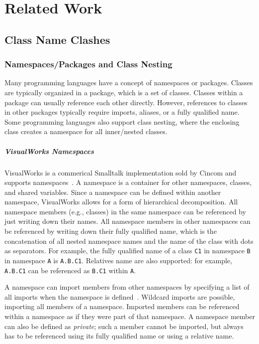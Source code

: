 \chapter{Related Work}
\label{sec:related}

\section{Class Name Clashes}

\subsection{Namespaces/Packages and Class Nesting}
Many programming languages have a concept of namespaces or packages. Classes are typically organized in a package, which is a set of classes. Classes within a package can usually reference each other directly. However, references to classes in other packages typically require imports, aliases, or a fully qualified name. Some programming languages also support class nesting, where the enclosing class creates a namespace for all inner/nested classes.

\paragraph{VisualWorks Namespaces}
VisualWorks is a commerical Smalltalk implementation sold by Cincom and supports namespaces~\cite{brauer2015programming}. A namespace is a container for other namespaces, classes, and shared variables. Since a namespace can be defined within another namespace, VisualWorks allows for a form of hierarchical decomposition. All namespace members (e.g., classes) in the same namespace can be referenced by just writing down their names. All namespace members in other namespaces can be referenced by writing down their fully qualified name, which is the concatenation of all nested namespace names and the name of the class with dots as separators. For example, the fully qualified name of a class \texttt{C1} in namespace \texttt{B} in namespace \texttt{A} is \texttt{A.B.C1}. Relatives name are also supported: for example, \texttt{A.B.C1} can be referenced as \texttt{B.C1} within \texttt{A}.

A namespace can import members from other namespaces by specifying a list of all imports when the namespace is defined~\cite{cincomst}. Wildcard imports are possible, importing all members of a namespace. Imported members can be referenced within a namespace as if they were part of that namespace. A namespace member can also be defined as \emph{private}; such a member cannot be imported, but always has to be referenced using its fully qualified name or using a relative name.

